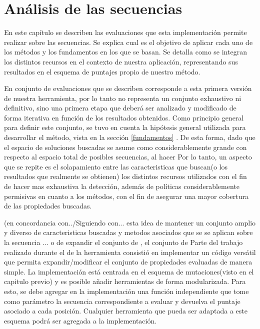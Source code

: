 \chapter{Análisis de las secuencias}
\label{tools}

En este capítulo se describen las evaluaciones que esta implementación permite realizar sobre las secuencias. 
Se explica cual es el objetivo de aplicar cada uno de los métodos y los fundamentos en los que se basan.
Se detalla como se integran los distintos recursos en el contexto de nuestra aplicación, representando sus resultados en el esquema de puntajes propio de nuestro método.

En conjunto de evaluaciones que se describen corresponde a esta primera versión de nuestra herramienta, por lo tanto no representa un conjunto exhaustivo ni definitivo, 
sino una primera etapa que deberá ser analizado y modificado de forma iterativa en función de los resultados obtenidos.
Como principio general para definir este conjunto, se tuvo en cuenta la hipótesis general utilizada para desarrollar el método, vista en la sección \ref{fundamentos} . 
De esta forma, dado que el espacio de soluciones buscadas se asume como considerablemente grande con respecto al espacio total de posibles secuencias, al hacer   
Por lo tanto, un aspecto que se repite es el solapamiento entre las caracteristicas que buscan(o los resultados que realmente se obtienen) los distintos recursos utilizados con el fin de hacer mas exhaustiva la detección, 
además de políticas considerablemente permisivas en cuanto a los métodos, con el fin de asegurar una mayor cobertura de las propiedades buscadas.

% 

(en concordancia con../Siguiendo con... esta idea de mantener un conjunto amplio y diverso de caracteristicas buscadas y metodos asociados que se se aplican sobre la secuencia ... o de expandir el conjunto de , el conjunto de 
Parte del trabajo realizado durante el de la herramienta consistió en implementar un código versátil que permita expandir/modificar el conjunto de propiedades evaluadas de manera simple.
La implementación está centrada en el esquema de mutaciones(visto en el capitulo previo) y es posible añadir herramientas de forma modularizada.
Para esto, se debe agregar en la implementación una función independiente que tome como parámetro la secuencia correspondiente a evaluar y devuelva el puntaje asociado a cada posición. 
Cualquier herramienta que pueda ser adaptada a este esquema podrá ser agregada a la implementación.


